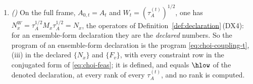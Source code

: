 \begin{lemma}
\begin{enumerate}[label=(\roman*),leftmargin=2.2em]
\begin{equation}
  \in\Pos{A_0},
\end{equation}
let $K^{N}_{\kappa}$ be \eqref{eq:kraus} with $\sqrt{N^{W}_x}$ in place of
$\sqrt{M_x}$, an operator
$\Hs{A_0\Qsys}\to\Hs{R\,XY\,C_AC_B\,A_0\Qsys}$, and let $\cG^{N}_{\hat c}$ be
\eqref{eq:GTheta} with $K^{N}_{\kappa}$. Then for every $J\in\Pos{A_0\Qsys}$,
every $(x,v)$ and every $\hat c$, with
$\omega\coloneqq\chi^{W}_{\Qsys}(J)$,
\begin{equation}\label{eq:choi-N}
  \tr[(M_x\otimes F_v)\,\omega]=\tr[(N^{W}_x\otimes F_v)\,J],\qquad
  \tr\cG_{\hat c}(\omega)=\tr\cG^{N}_{\hat c}(J),\qquad
  T\big(\cG_{\hat c}(\omega)\big)=T\big(\cG^{N}_{\hat c}(J)\big),
\end{equation}
$T$ the functional \eqref{eq:Tcone}; hence $P_{\hat c}$, $K_{\hat c}$ and
$O_{\alpha}$ at $\omega$ are functions of $J$, $\{N^{W}_x\}$, $\{F_v\}$ and
the classical maps alone, and the same holds sector by sector for the
joint-sector quantities of Definition~\ref{def:joint-sectors}.
\item \emph{()} On the full frame, $A_{0,t}=A_t$ and
$W_t=(\tau^{(t)}_A)^{1/2}$, one has
$N^{W}_x=\tau_A^{1/2}M_x\tau_A^{1/2}=N_x$, the operators of
Definition~\ref{def:declaration}\,(DX4): for an ensemble-form declaration
they are the \emph{declared} numbers. So the program of an ensemble-form
declaration is the program \eqref{eq:choi-coupling-t}, (iii) in the declared
$\{N_x\}$ and $\{F_v\}$, with every constraint row in the conjugated form of
\eqref{eq:choi-feas}; it is defined, and equals $\hlow$ of the denoted
declaration, at every rank of every $\tau^{(t)}_A$, and no rank is computed.
\end{enumerate}
\end{lemma}

